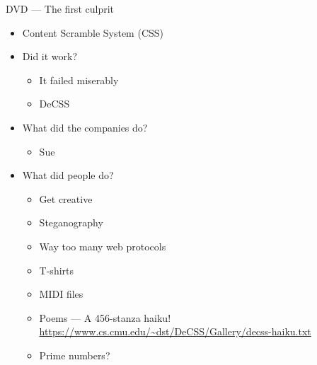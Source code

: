 \documentclass{beamer}
\begin{document}
\begin{frame}{DVD --- The first culprit}
	\begin{itemize}
		\item Content Scramble System (CSS)
		\item Did it work?
		      \begin{itemize}
			      \item It failed miserably
			      \item DeCSS\pause{}
		      \end{itemize}
		\item What did the companies do?\pause{}
		      \begin{itemize}
			      \item Sue\pause{}
		      \end{itemize}
		\item What did people do?\pause{}
		      \begin{itemize}
			      \item Get creative\pause{}
			      \item Steganography\pause{}
			      \item Way too many web protocols\pause{}
			      \item T-shirts\pause{}
			      \item MIDI files\pause{}
			      \item Poems --- A 456-stanza haiku! \url{https://www.cs.cmu.edu/~dst/DeCSS/Gallery/decss-haiku.txt}\pause{}
			      \item Prime numbers?
		      \end{itemize}
	\end{itemize}
\end{frame}
\end{document}
